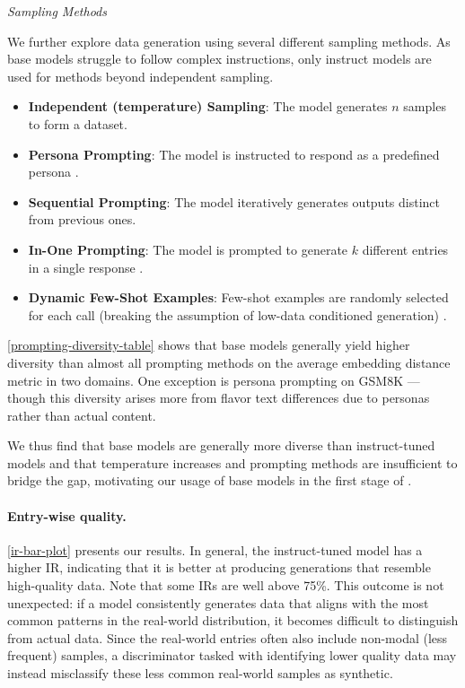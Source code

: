 

\textit{Sampling Methods}

We further explore data generation using several different sampling methods. As base models struggle to follow complex instructions, only instruct models are used for methods beyond independent sampling.

\begin{itemize}
    \setlength\itemsep{0em}
    \item \textbf{Independent (temperature) Sampling}: The model generates $n$ samples to form a dataset.
    \item \textbf{Persona Prompting}: The model is instructed to respond as a predefined persona \cite{frohling2024personas}.
    \item \textbf{Sequential Prompting}: The model iteratively generates outputs distinct from previous ones.
    \item \textbf{In-One Prompting}: The model is prompted to generate $k$ different entries in a single response \cite{zhang-etal-2024-improving-diversity}.
    \item \textbf{Dynamic Few-Shot Examples}: Few-shot examples are randomly selected for each call (breaking the assumption of low-data conditioned generation) \cite{li2022making}.
\end{itemize}

\cref{prompting-diversity-table} shows that base models generally yield higher diversity than almost all prompting methods on the average embedding distance metric in two domains. One exception is persona prompting on GSM8K --- though this diversity arises more from flavor text differences due to personas rather than actual content.

We thus find that base models are generally more diverse than instruct-tuned models and that temperature increases and prompting methods are insufficient to bridge the gap, motivating our usage of base models in the first stage of \Sys{}.



\paragraph{Entry-wise quality.} \cref{ir-bar-plot} presents our results. In general, the instruct-tuned model has a higher IR, indicating that it is better at producing generations that resemble high-quality data. Note that some IRs are well above 75\%. This outcome is not unexpected: if a model consistently generates data that aligns with the most common patterns in the real-world distribution, it becomes difficult to distinguish from actual data. Since the real-world entries often also include non-modal (less frequent) samples, a discriminator tasked with identifying lower quality data may instead misclassify these less common real-world samples as synthetic.

